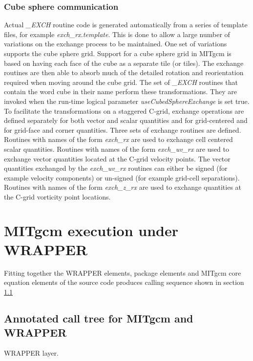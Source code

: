 \subsubsection{Cube sphere communication}
\label{sect:cube_sphere_communication}
Actual {\em \_EXCH} routine code is generated automatically from 
a series of template files, for example {\em exch\_rx.template}.
This is done to allow a large number of variations on the exchange 
process to be maintained. One set of variations supports the
cube sphere grid. Support for a cube sphere grid in MITgcm is based
on having each face of the cube as a separate tile (or tiles).
The exchange routines are then able to absorb much of the
detailed rotation and reorientation required when moving around the
cube grid. The set of {\em \_EXCH} routines that contain the
word cube in their name perform these transformations.
They are invoked when the run-time logical parameter
{\em useCubedSphereExchange} is set true. To facilitate the
transformations on a staggered C-grid, exchange operations are defined 
separately for both vector and scalar quantities and for
grid-centered and for grid-face and corner quantities.
Three sets of exchange routines are defined. Routines
with names of the form {\em exch\_rx} are used to exchange
cell centered scalar quantities. Routines with names of the form
{\em exch\_uv\_rx} are used to exchange vector quantities located at
the C-grid velocity points. The vector quantities exchanged by the 
{\em exch\_uv\_rx} routines can either be signed (for example velocity 
components) or un-signed (for example grid-cell separations).
Routines with names of the form {\em exch\_z\_rx} are used to exchange 
quantities at the C-grid vorticity point locations.




\section{MITgcm execution under WRAPPER}

Fitting together the WRAPPER elements, package elements and
MITgcm core equation elements of the source code produces calling
sequence shown in section \ref{sect:calling_sequence}

\subsection{Annotated call tree for MITgcm and WRAPPER}
\label{sect:calling_sequence}

WRAPPER layer.

